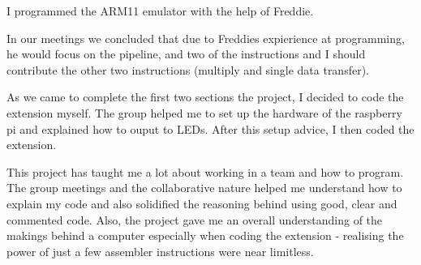 I programmed the ARM11 emulator with the help of Freddie. 

In our meetings we concluded that due to Freddies expierience at programming, he would focus on the pipeline, and two of the instructions and I should contribute the other two instructions (multiply and single data transfer).

As we came to complete the first two sections the project, I decided to code the extension myself. The group helped me to set up the hardware of the raspberry pi and explained how to ouput to LEDs. After this setup advice, I then coded the extension. 

This project has taught me a lot about working in a team and how to program. The group meetings and the collaborative nature helped me understand how to explain my code and also solidified the reasoning behind using good, clear and commented code. Also, the project gave me an overall understanding of the makings behind a computer especially when coding the extension - realising the power of just a few assembler instructions were near limitless.
